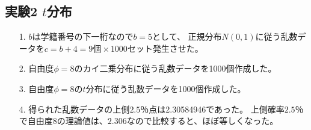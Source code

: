 \documentclass[12pt]{jarticle}
\begin{document}
\subsection{実験2 $t$分布}
\begin{itemize}
      \item [1.]$b$は学籍番号の下一桁なので$b=5$として、
            正規分布$N(0,1)$に従う乱数データを$c=b+4=9個\times 1000セット$発生させた。
      \item [2.]自由度$\phi=8$のカイ二乗分布に従う乱数データを1000個作成した。
      \item [3.]自由度$\phi=8$の$t$分布に従う乱数データを1000個作成した。
      \item [4.]得られた乱数データの上側$2.5％$点は2.30584946であった。
            上側確率$2.5％$で自由度$8$の理論値は、$2.306$なので比較すると、ほぼ等しくなった。
\end{itemize}
\end{document}
